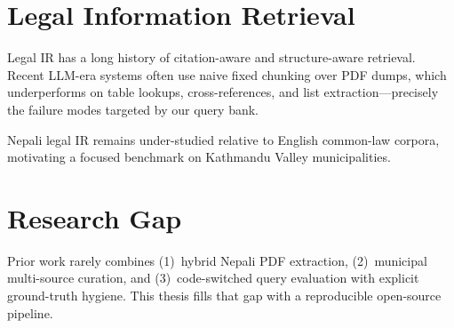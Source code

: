 \section{Legal Information Retrieval}
Legal IR has a long history of citation-aware and structure-aware retrieval. Recent LLM-era systems often use naive fixed chunking over PDF dumps, which underperforms on table lookups, cross-references, and list extraction---precisely the failure modes targeted by our query bank.

Nepali legal IR remains under-studied relative to English common-law corpora, motivating a focused benchmark on Kathmandu Valley municipalities.

\section{Research Gap}
Prior work rarely combines (1)~hybrid Nepali PDF extraction, (2)~municipal multi-source curation, and (3)~code-switched query evaluation with explicit ground-truth hygiene. This thesis fills that gap with a reproducible open-source pipeline.
